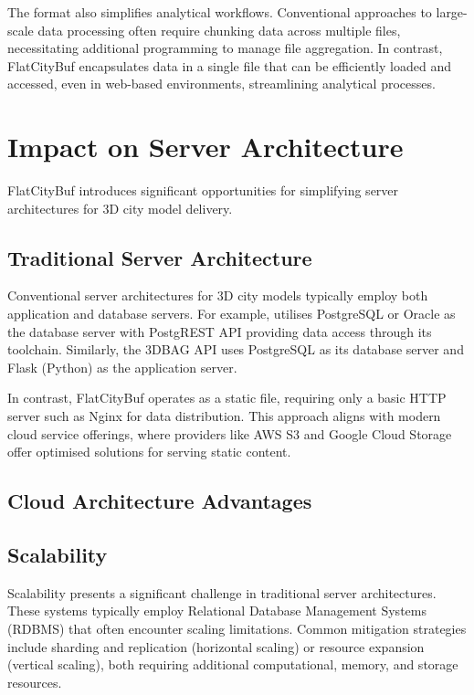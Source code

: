 The format also simplifies analytical workflows. Conventional approaches to large-scale data processing often require chunking data across multiple files, necessitating additional programming to manage file aggregation. In contrast, FlatCityBuf encapsulates data in a single file that can be efficiently loaded and accessed, even in web-based environments, streamlining analytical processes.

\section{Impact on Server Architecture}
\label{affect_on_server_architecture}

FlatCityBuf introduces significant opportunities for simplifying server architectures for 3D city model delivery.

\subsection{Traditional Server Architecture}
\label{traditional_server_architecture}

Conventional server architectures for 3D city models typically employ both application and database servers. For example, \citet{3dcitydb} utilises PostgreSQL or Oracle as the database server with PostgREST API \citep{postgrest} providing data access through its toolchain. Similarly, the 3DBAG API uses PostgreSQL as its database server and Flask (Python) as the application server.

In contrast, FlatCityBuf operates as a static file, requiring only a basic HTTP server such as Nginx for data distribution. This approach aligns with modern cloud service offerings, where providers like AWS S3 and Google Cloud Storage offer optimised solutions for serving static content.

\subsection{Cloud Architecture Advantages}
\label{cloud_architecture_achieved}

\subsection{Scalability}
\label{scalability}

Scalability presents a significant challenge in traditional server architectures. These systems typically employ Relational Database Management Systems (RDBMS) that often encounter scaling limitations. Common mitigation strategies include sharding and replication (horizontal scaling) or resource expansion (vertical scaling), both requiring additional computational, memory, and storage resources.

